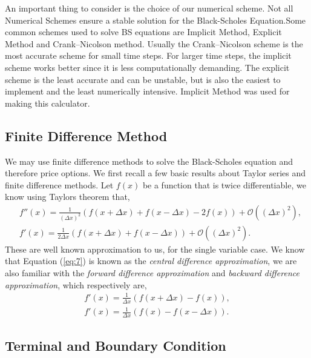 \documentclass[12pt]{article}
\begin{document}
An important thing to consider is the choice of our numerical scheme. Not all Numerical Schemes ensure a stable solution for the Black-Scholes Equation.Some common schemes used to solve BS equations are Implicit Method, Explicit Method and Crank–Nicolson method.
Usually the Crank–Nicolson scheme is the most accurate scheme for small time steps. For larger time steps, the implicit scheme works better since it is less computationally demanding. The explicit scheme is the least accurate and can be unstable, but is also the easiest to implement and the least numerically intensive. Implicit Method was used for making this calculator.

	
\subsection{Finite Difference Method}

\label{fdms}
We may use finite difference methods to solve the Black-Scholes equation and therefore price options. We first recall a few basic results about Taylor series and finite difference methods. Let $f(x)$ be a function that is twice differentiable, we know using Taylors theorem that,
\begin{align}
	&f''(x) = \frac{1}{(\Delta x)^2} (f(x + \Delta x) + f(x - \Delta x) - 2f(x))  + \mathcal{O}((\Delta x)^2)\label{C1},\\
	&f'(x) = \frac{1}{2\Delta x}(f(x + \Delta x) + f(x - \Delta x)) + \mathcal{O}((\Delta x)^2). \label{eq:7}
\end{align}
These are well known approximation to us, for the single variable case. We know that Equation (\ref{eq:7}) is known as the \emph{central difference approximation}, we are also familiar with the \emph{forward difference approximation} and \emph{backward difference approximation}, which respectively are,
\begin{align*}
	f'(x) = \frac{1}{\Delta x}(f(x + \Delta x) -f(x)), \\
	f'(x) = \frac{1}{\Delta x}(f(x) -f(x-\Delta x)).
\end{align*}

\subsection{Terminal and Boundary Condition}
\end{document}
